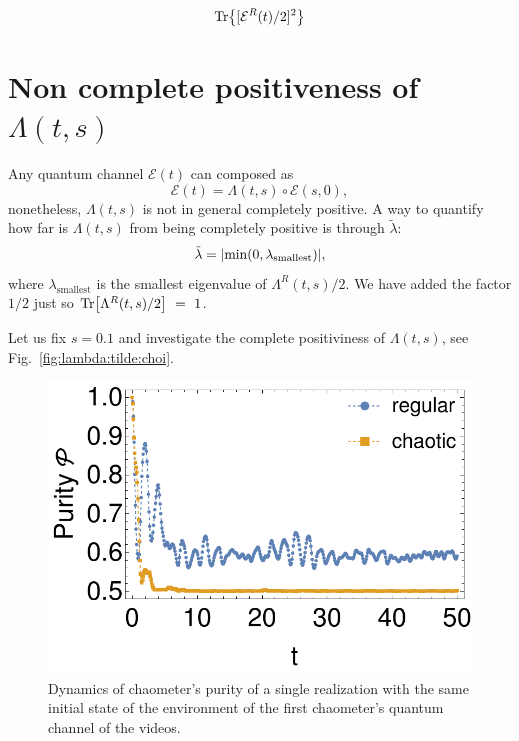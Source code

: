 \documentclass[10pt,letterpaper]{article}
\newcommand{\Fref}[1]{Fig.~\ref{#1}}
\newcommand{\mcE}{\mathcal E}
\begin{document}
\begin{equation}
\Tr{[ \mcE^R(t)/2]^2}
\end{equation}


\section{Non complete positiveness of $\Lambda(t, s)$}
Any quantum channel $\mcE(t)$ can composed as 
\begin{equation}\label{eq:Lambda}
\mcE(t) = 
\Lambda(t,s) \circ \mcE(s, 0),
\end{equation}
nonetheless, $\Lambda(t,s)$ is not in general completely positive. A way to 
quantify how far is $\Lambda(t,s)$ from being completely positive is through 
$\tilde \lambda$:
\begin{equation}\label{eq:lambda:tilde}
\tilde \lambda = 
\abs{\min(0, \lambda_{\text{smallest}})},
\end{equation}
where $\lambda_{\text{smallest}}$ is the smallest eigenvalue of 
$\Lambda^R(t,s)/2$. We have added the factor $1/2$ just so 
$\Tr[\Lambda^R(t,s)/2]~=~1$.

Let us fix $s=0.1$ and investigate the complete positiviness of 
$\Lambda(t, s)$, see \Fref{fig:lambda:tilde:choi}.

\begin{figure}
\centering
\includegraphics[width=.6\textwidth]{purity_one_realization.pdf}
\caption{Dynamics of chaometer's purity of a single realization 
with the same initial state of the environment of the first chaometer's 
quantum channel of the videos.}
\label{fig:purity:one:realization}
\end{figure}
\end{document}
